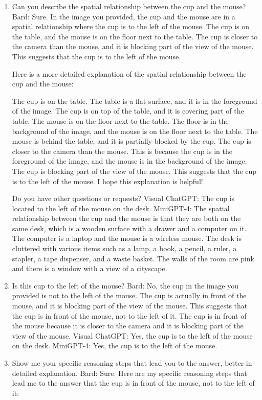 \begin{enumerate}
    \item Can you describe the spatial relationship between the cup and the mouse?
    \subitem Bard:
    Sure. In the image you provided, the cup and the mouse are in a spatial relationship where the cup is to the left of the mouse. The cup is on the table, and the mouse is on the floor next to the table. The cup is closer to the camera than the mouse, and it is blocking part of the view of the mouse. This suggests that the cup is to the left of the mouse.

    Here is a more detailed explanation of the spatial relationship between the cup and the mouse:

    The cup is on the table. The table is a flat surface, and it is in the foreground of the image. The cup is on top of the table, and it is covering part of the table.
    The mouse is on the floor next to the table. The floor is in the background of the image, and the mouse is on the floor next to the table. The mouse is behind the table, and it is partially blocked by the cup.
    The cup is closer to the camera than the mouse. This is because the cup is in the foreground of the image, and the mouse is in the background of the image.
    The cup is blocking part of the view of the mouse. This suggests that the cup is to the left of the mouse.
    I hope this explanation is helpful!

    Do you have other questions or requests?
    \subitem Visual ChatGPT: The cup is located to the left of the mouse on the desk.
    \subitem MiniGPT-4: The spatial relationship between the cup and the mouse is that they are both on the same desk, which is a wooden surface with a drawer and a computer on it. The computer is a laptop and the mouse is a wireless mouse. The desk is cluttered with various items such as a lamp, a book, a pencil, a ruler, a stapler, a tape dispenser, and a waste basket. The walls of the room are pink and there is a window with a view of a cityscape.
    \item Is this cup to the left of the mouse?
    \subitem Bard: 
    No, the cup in the image you provided is not to the left of the mouse. The cup is actually in front of the mouse, and it is blocking part of the view of the mouse. This suggests that the cup is in front of the mouse, not to the left of it. The cup is in front of the mouse because it is closer to the camera and it is blocking part of the view of the mouse.
    \subitem Visual ChatGPT: Yes, the cup is to the left of the mouse on the desk.
    \subitem MiniGPT-4: Yes, the cup is to the left of the mouse.
    \item Show me your specific reasoning steps that lead you to the answer, better in detailed explanation.
    \subitem Bard: 
    Sure. Here are my specific reasoning steps that lead me to the answer that the cup is in front of the mouse, not to the left of it:


\end{enumerate}
